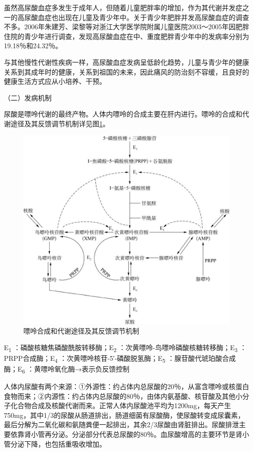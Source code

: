 虽然高尿酸血症多发生于成年人，但随着儿童肥胖率的增加，作为其代谢并发症之一的高尿酸血症也出现在儿童及青少年中。关于青少年肥胖并发高尿酸血症的调查不多。2006年朱建芳、梁黎等对浙江大学医学院附属儿童医院2003～2005年因肥胖住院的青少年进行调查，发现高尿酸血症在中、重度肥胖青少年中的发病率分别为19.18％和24.32％。

与其他慢性代谢性疾病一样，高尿酸血症发病呈低龄化趋势，儿童与青少年的健康关系到其成年时的健康，关系到祖国的未来，因此痛风的防治刻不容缓，且良好的健康生活方式应从小培养、干预。

（二）发病机制

尿酸是嘌呤代谢的最终产物。人体内嘌呤的合成主要在肝内进行。嘌呤的合成和代谢途径及其反馈调节机制详见图\ref{fig3-2}。

\begin{figure}[!htbp]
 \centering
 \includegraphics{./images/Image00039.jpg}
 \captionsetup{justification=centering}
 \caption{嘌呤合成和代谢途径及其反馈调节机制}
 \label{fig3-2}
  \end{figure} 

E\textsubscript{1} ：磷酸核糖焦磷酸酰胺转移酶；E\textsubscript{2}
：次黄嘌呤-鸟嘌呤磷酸核糖转移酶；E\textsubscript{3}
：PRPP合成酶；E\textsubscript{4}
：次黄嘌呤核苷-5′-磷酸脱氢酶；E\textsubscript{5}
：腺苷酸代琥珀酸合成酶；E\textsubscript{6} ：黄嘌呤氧化酶→表示负反馈控制

人体内尿酸有两个来源：①外源性：约占体内总尿酸的20％，从富含嘌呤或核蛋白食物而来；②内源性：约占体内总尿酸的80％，由体内氨基酸、核苷酸及其他小分子化合物合成及核酸代谢而来。正常人体内尿酸池平均为1200mg，每天产生750mg，其中1/3的尿酸从肠道排出，肠道细菌有尿酸酶，使尿酸转变成尿囊素，最后分解为二氧化碳和氨随粪便一起排出，其余2/3尿酸由肾脏排出。尿酸排泄主要依靠肾小管再分泌。分泌部分代表总尿酸的80％。血尿酸增高的主要环节是肾小管分泌下降，也包括重吸收增加。

